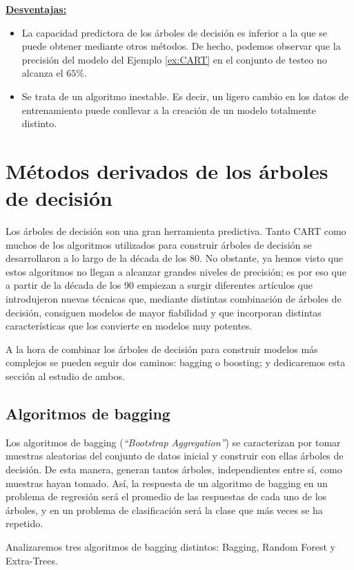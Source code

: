 \documentclass[12pt,twoside]{article}
\begin{document}
\textbf{\underline{Desventajas:}}
\begin{itemize}
\item La capacidad predictora de los árboles de decisión es inferior a la que se puede obtener mediante otros métodos. De hecho, podemos observar que la precisión del modelo del Ejemplo \ref{ex:CART} en el conjunto de testeo no alcanza el $65\%$.
\item Se trata de un algoritmo inestable. Es decir, un ligero cambio en los datos de entrenamiento puede conllevar a la creación de un modelo totalmente distinto. %
\end{itemize}





\newpage
\section{Métodos derivados de los árboles de decisión}
Los árboles de decisión son una gran herramienta predictiva. Tanto CART como muchos de los algoritmos utilizados para construir árboles de decisión se desarrollaron a lo largo de la década de los 80. No obstante, ya hemos visto que estos algoritmos no llegan a alcanzar grandes niveles de precisión; es por eso que a partir de la década de los 90 empiezan a surgir diferentes artículos que introdujeron nuevas técnicas que, mediante distintas combinación de árboles de decisión, consiguen modelos de mayor fiabilidad y que incorporan distintas características que los convierte en modelos muy potentes.

A la hora de combinar los árboles de decisión para construir modelos más complejos se pueden seguir dos caminos: bagging o boosting; y dedicaremos esta sección al estudio de ambos.


\subsection{Algoritmos de bagging}
Los algoritmos de bagging (\textit{``Bootstrap Aggregation''}) se caracterizan por tomar muestras aleatorias del conjunto de datos inicial y construir con ellas árboles de decisión. De esta manera, generan tantos árboles, independientes entre sí, como muestras hayan tomado. Así, la respuesta de un algoritmo de bagging en un problema de regresión será el promedio de las respuestas de cada uno de los árboles, y en un problema de clasificación será la clase que más veces se ha repetido.

Analizaremos tres algoritmos de bagging distintos: Bagging, Random Forest y Extra-Trees.
\end{document}
